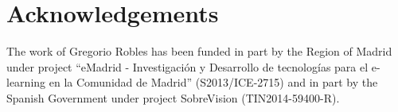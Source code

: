 \documentclass[a4paper]{article}
\begin{document}
\section{Acknowledgements}

The work of Gregorio Robles has been funded in part by the Region of Madrid under project ``eMadrid - Investigaci\'on y Desarrollo de tecnolog\'ias para el e-learning en la Comunidad de Madrid'' (S2013/ICE-2715) and in part by the Spanish Government under project SobreVision (TIN2014-59400-R).




\end{document}
